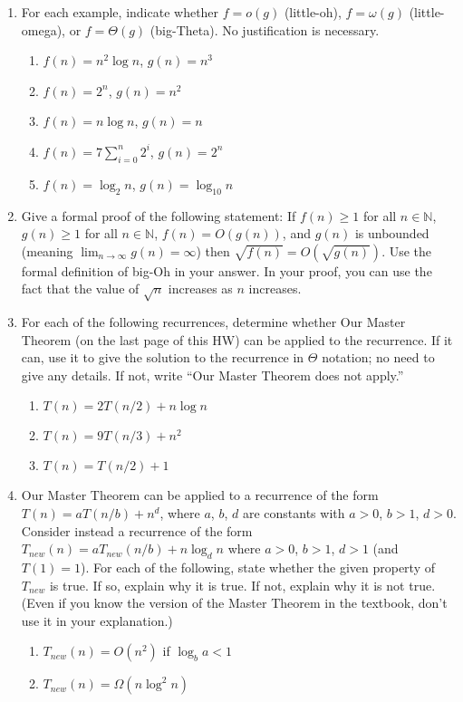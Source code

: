 \documentclass{article}
\begin{document}
\begin{enumerate}
    \item For each example, indicate whether $f = o(g)$ (little-oh), $f = \omega(g)$ (little-omega), or $f = \Theta(g)$ (big-Theta). No justification is necessary.
    \begin{enumerate}
        \item $f(n) = n^2 \log n$, $g(n) = n^3$
        \item $f(n) = 2^n$, $g(n) = n^2$
        \item $f(n) = n \log n$, $g(n) = n$
        \item $f(n) = 7 \sum_{i=0}^n 2^i$, $g(n) = 2^n$
        \item $f(n) = \log_2 n$, $g(n) = \log_{10} n$
    \end{enumerate}

    \item Give a formal proof of the following statement: If $f(n) \ge 1$ for all $n \in \mathbb{N}$, $g(n) \ge 1$ for all $n \in \mathbb{N}$, $f(n) = O(g(n))$, and $g(n)$ is unbounded (meaning $\lim_{n\to\infty} g(n) = \infty$) then $\sqrt{f(n)} = O(\sqrt{g(n)})$.
    Use the formal definition of big-Oh in your answer. In your proof, you can use the fact that the value of $\sqrt{n}$ increases as $n$ increases.


    \item For each of the following recurrences, determine whether Our Master Theorem (on the last page of this HW) can be applied to the recurrence. If it can, use it to give the solution to the recurrence in $\Theta$ notation; no need to give any details. If not, write “Our Master Theorem does not apply.”
    \begin{enumerate}
        \item $T(n) = 2T(n/2) + n \log n$
        \item $T(n) = 9T(n/3) + n^2$
        \item $T(n) = T(n/2) + 1$
    \end{enumerate}

    \item Our Master Theorem can be applied to a recurrence of the form $T(n) = aT(n/b) + n^d$, where $a$, $b$, $d$ are constants with $a > 0$, $b > 1$, $d > 0$. Consider instead a recurrence of the form $T_{new}(n) = aT_{new}(n/b) + n \log_d n$ where $a > 0$, $b > 1$, $d > 1$ (and $T(1) = 1$).
    For each of the following, state whether the given property of $T_{new}$ is true. If so, explain why it is true. If not, explain why it is not true. (Even if you know the version of the Master Theorem in the textbook, don’t use it in your explanation.)
    \begin{enumerate}
        \item $T_{new}(n) = O(n^2)$ if $\log_b a < 1$
        \item $T_{new}(n) = \Omega(n \log^2 n)$
    \end{enumerate}


\end{enumerate}
\end{document}
